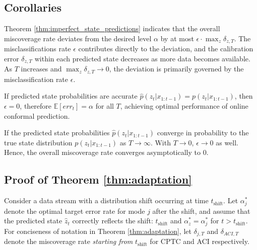 \subsection{Corollaries}

Theorem \ref{thm:imperfect_state_predictions} indicates that the overall miscoverage rate deviates from the desired level \( \alpha \) by at most \( \epsilon \cdot \max_z \delta_{z,T} \). The misclassifications rate \( \epsilon \) contributes directly to the deviation, and the calibration error \( \delta_{z,T} \) within each predicted state decreases as more data becomes available. As \( T \) increases and \( \max_z \delta_{z,T} \to 0 \), the deviation is primarily governed by the misclassification rate \( \epsilon \). 

\vspace{0.5em}
\begin{corollary}
 If predicted state probabilities are accurate \( \hat{p}(z_t | x_{1:t-1}) = p(z_t | x_{1:t-1}) \), then \( \epsilon = 0 \), therefore $\mathbb{E}[err_t] = \alpha$ for all $T$, achieving optimal performance of online conformal prediction. 
\end{corollary}

\vspace{0.5em}

\begin{corollary}
If the predicted state probabilities \( \hat{p}(z_t | x_{1:t-1}) \) converge in probability to the true state distribution \( p(z_t | x_{1:t-1}) \) as \( T \to \infty \). With \( T \to 0\), \( \epsilon \to 0 \) as well. Hence, the overall miscoverage rate converges asymptotically to 0.
\end{corollary}

\subsection{Proof of Theorem \ref{thm:adaptation}}

Consider a data stream with a distribution shift occurring at time $t_{{\text{shift}}}$. Let $\alpha^*_{j}$ denote the optimal target error rate for mode $j$ after the shift, and assume that the predicted state $\hat{z}_t$ correctly reflects the shift: $t_{\text{shift}}$ and $\alpha^*_{z} = \alpha^*_{j}$ for $t > t_{{\text{shift}}}$. For conciseness of notation in Theorem \ref{thm:adaptation}, let $\delta_{j,T}$ and $\delta_{ACI,T}$ denote the miscoverage rate \textit{starting from } $t_{\text{shift}}$ for CPTC and ACI respectively.


